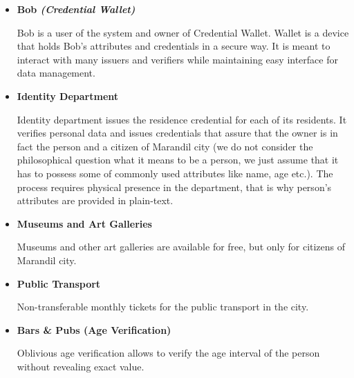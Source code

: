 \begin{itemize}[label=$\circ$]
    \item \textbf{Bob \em{(Credential Wallet)}}
    
    Bob is a user of the system and owner of Credential Wallet. Wallet is a device that holds Bob's attributes and credentials in a secure way. It is meant to interact with many issuers and verifiers while maintaining easy interface for data management.
    
    \item \textbf{Identity Department }
    
    Identity department issues the residence credential for each of its residents. It verifies personal data and issues credentials that assure that the owner is in fact the person and a citizen of Marandil city (we do not consider the philosophical question what it means to be a person, we just assume that it has to possess some of commonly used attributes like name, age etc.). The process requires physical presence in the department, that is why person's attributes are provided in plain-text.
    
    \item \textbf{Museums and Art Galleries}
    
    Museums and other art galleries are available for free, but only for citizens of Marandil city.
    
    \item \textbf{Public Transport}
    
    Non-transferable monthly tickets for the public transport in the city.
    
    
    
    
    
    
    \item \textbf{Bars \& Pubs (Age Verification)}
    
    Oblivious age verification allows to verify the age interval of the person without revealing exact value.
    
\end{itemize}


